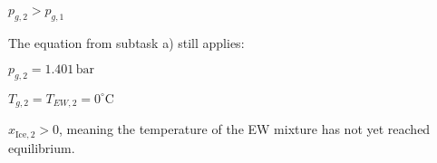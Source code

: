 \( p_{g,2} > p_{g,1} \)  

The equation from subtask a) still applies:  

\( p_{g,2} = 1.401 \, \text{bar} \)  

\( T_{g,2} = T_{EW,2} = 0^\circ \text{C} \)  

\( x_{\text{Ice},2} > 0 \), meaning the temperature of the EW mixture has not yet reached equilibrium.